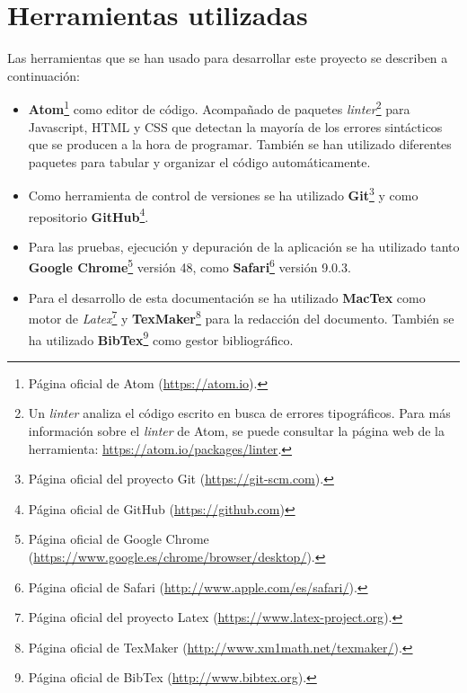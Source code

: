 \section{Herramientas utilizadas}
\label{sec:herramientas}

Las herramientas que se han usado para desarrollar este proyecto se describen a continuación:

\begin{itemize}
	\item \textbf{Atom}\footnote{Página oficial de Atom (\url{https://atom.io}).} como editor de código. Acompañado de paquetes \emph{linter}\footnote{Un \emph{linter} analiza el código escrito en busca de errores tipográficos. Para más información sobre el \emph{linter} de Atom, se puede consultar la página web de la herramienta: \url{https://atom.io/packages/linter}.} para Javascript, HTML y CSS que detectan la mayoría de los errores sintácticos que se producen a la hora de programar. También se han utilizado diferentes paquetes para tabular y organizar el código automáticamente. 

	\item Como herramienta de control de versiones se ha utilizado \textbf{Git}\footnote{Página oficial del proyecto Git (\url{https://git-scm.com}).} y como repositorio \textbf{GitHub}\footnote{Página oficial de GitHub (\url{https://github.com})}.
	
	\item Para las pruebas, ejecución y depuración de la aplicación se ha utilizado tanto \textbf{Google Chrome}\footnote{Página oficial de Google Chrome (\url{https://www.google.es/chrome/browser/desktop/}).} versión 48, como \textbf{Safari}\footnote{Página oficial de Safari (\url{http://www.apple.com/es/safari/}).} versión 9.0.3.
	
	\item Para el desarrollo de esta documentación se ha utilizado \textbf{MacTex} como motor de \emph{Latex}\footnote{Página oficial del proyecto Latex (\url{https://www.latex-project.org}).} y \textbf{TexMaker}\footnote{Página oficial de TexMaker (\url{http://www.xm1math.net/texmaker/}).} para la redacción del documento. También se ha utilizado \textbf{BibTex}\footnote{Página oficial de BibTex (\url{http://www.bibtex.org}).} como gestor bibliográfico.
\end{itemize}


